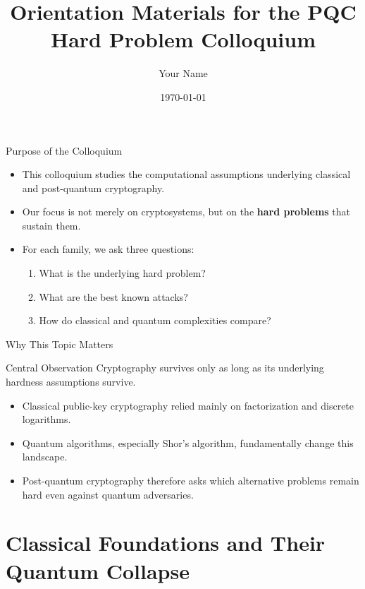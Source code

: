 \documentclass[aspectratio=169]{beamer}
\title[PQC Hard Problem Colloquium]{Orientation Materials for the PQC Hard Problem Colloquium}
\author{Your Name}
\institute{Your Institution / Research Group}
\date{\today}
\begin{document}
	
	\begin{frame}
		\titlepage
	\end{frame}
	
	\begin{frame}{Purpose of the Colloquium}
		\begin{itemize}
			\item This colloquium studies the computational assumptions underlying classical and post-quantum cryptography.
			\item Our focus is not merely on cryptosystems, but on the \textbf{hard problems} that sustain them.
			\item For each family, we ask three questions:
			\begin{enumerate}
				\item What is the underlying hard problem?
				\item What are the best known attacks?
				\item How do classical and quantum complexities compare?
			\end{enumerate}
		\end{itemize}
	\end{frame}
	
	\begin{frame}{Why This Topic Matters}
		\begin{block}{Central Observation}
			Cryptography survives only as long as its underlying hardness assumptions survive.
		\end{block}
		
		\begin{itemize}
			\item Classical public-key cryptography relied mainly on factorization and discrete logarithms.
			\item Quantum algorithms, especially Shor's algorithm, fundamentally change this landscape.
			\item Post-quantum cryptography therefore asks which alternative problems remain hard even against quantum adversaries.
		\end{itemize}
	\end{frame}
	
	\section{Classical Foundations and Their Quantum Collapse}
	
\end{document}
